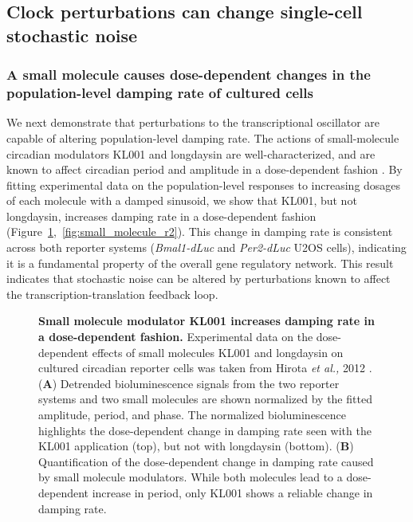 \documentclass[11pt, letterpaper]{article}
\begin{document}
\subsection*{Clock perturbations can change single-cell stochastic noise}

\subsubsection*{A small molecule causes dose-dependent changes in the population-level damping rate of cultured cells}

We next demonstrate that perturbations to the transcriptional oscillator are capable of altering population-level damping rate.
The actions of small-molecule circadian modulators KL001 and longdaysin are well-characterized, and are known to affect circadian period and amplitude in a dose-dependent fashion \cite{St.John2014}.
By fitting experimental data on the population-level responses to increasing dosages of each molecule with a damped sinusoid, we show that KL001, but not longdaysin, increases damping rate in a dose-dependent fashion (Figure~\ref{fig:dose_dependence},~\ref{fig:small_molecule_r2}).
This change in damping rate is consistent across both reporter systems ({\itshape Bmal1-dLuc} and {\itshape Per2-dLuc} U2OS cells), indicating it is a fundamental property of the overall gene regulatory network.
This result indicates that stochastic noise can be altered by perturbations known to affect the transcription-translation feedback loop.

\begin{figure}[tbp]
  \begin{center}
  \end{center}
  \caption{{\bfseries Small molecule modulator KL001 increases damping rate in a dose-dependent fashion.}
  Experimental data on the dose-dependent effects of small molecules KL001 and longdaysin on cultured circadian reporter cells was taken from Hirota {\itshape et al.,} 2012 \cite{Hirota2012}.
({\bfseries A}) Detrended bioluminescence signals from the two reporter systems and two small molecules are shown normalized by the fitted amplitude, period, and phase. The normalized bioluminescence highlights the dose-dependent change in damping rate seen with the KL001 application (top), but not with longdaysin (bottom).
({\bfseries B}) Quantification of the dose-dependent change in damping rate caused by small molecule modulators. While both molecules lead to a dose-dependent increase in period, only KL001 shows a reliable change in damping rate.}
\label{fig:dose_dependence}
\end{figure}
\end{document}
